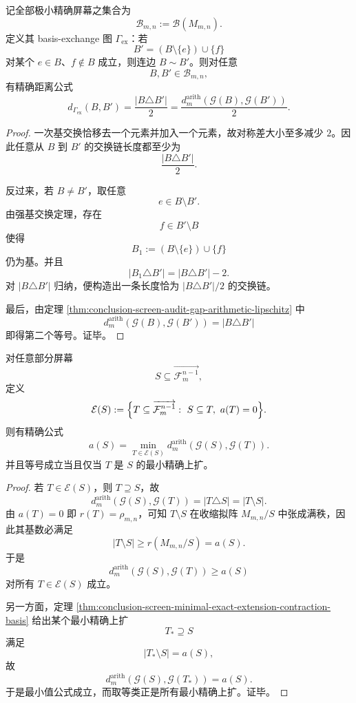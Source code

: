 \begin{theorem}[极小精确屏幕交换图的测地刚性]\label{thm:conclusion-screen-basis-exchange-graph-geodesic-rigidity}
记全部极小精确屏幕之集合为
\[
\mathcal B_{m,n}:=\mathcal B(M_{m,n}).
\]
定义其 basis-exchange 图 \(\Gamma_{\mathrm{ex}}\)：若
\[
B'=(B\setminus\{e\})\cup\{f\}
\]
对某个 \(e\in B\)、\(f\notin B\) 成立，则连边 \(B\sim B'\)。则对任意
\[
B,B'\in \mathcal B_{m,n},
\]
有精确距离公式
\[
d_{\Gamma_{\mathrm{ex}}}(B,B')
=
\frac{|B\triangle B'|}{2}
=
\frac{d_m^{\mathrm{arith}}(\mathcal G(B),\mathcal G(B'))}{2}.
\]
\end{theorem}
\begin{proof}
一次基交换恰移去一个元素并加入一个元素，故对称差大小至多减少 \(2\)。因此任意从 \(B\) 到 \(B'\) 的交换链长度都至少为
\[
\frac{|B\triangle B'|}{2}.
\]

反过来，若 \(B\neq B'\)，取任意
\[
e\in B\setminus B'.
\]
由强基交换定理，存在
\[
f\in B'\setminus B
\]
使得
\[
B_1:=(B\setminus\{e\})\cup\{f\}
\]
仍为基。并且
\[
|B_1\triangle B'|=|B\triangle B'|-2.
\]
对 \(|B\triangle B'|\) 归纳，便构造出一条长度恰为 \(|B\triangle B'|/2\) 的交换链。

最后，由定理 \ref{thm:conclusion-screen-audit-gap-arithmetic-lipschitz} 中
\[
d_m^{\mathrm{arith}}(\mathcal G(B),\mathcal G(B'))=|B\triangle B'|
\]
即得第二个等号。证毕。
\end{proof}

\begin{theorem}\label{thm:conclusion-screen-directed-arithmetic-distance-to-exact}
对任意部分屏幕
\[
S\subseteq \overrightarrow{\mathcal F_m^{n-1}},
\]
定义
\[
\mathcal E(S):=
\Bigl\{
T\subseteq \overrightarrow{\mathcal F_m^{n-1}}:\ 
S\subseteq T,\ a(T)=0
\Bigr\}.
\]
则有精确公式
\[
a(S)=\min_{T\in\mathcal E(S)} d_m^{\mathrm{arith}}(\mathcal G(S),\mathcal G(T)).
\]
并且等号成立当且仅当 \(T\) 是 \(S\) 的最小精确上扩。
\end{theorem}
\begin{proof}
若 \(T\in\mathcal E(S)\)，则 \(T\supseteq S\)，故
\[
d_m^{\mathrm{arith}}(\mathcal G(S),\mathcal G(T))
=
|T\triangle S|
=
|T\setminus S|.
\]
由 \(a(T)=0\) 即 \(r(T)=\rho_{m,n}\)，可知 \(T\setminus S\) 在收缩拟阵 \(M_{m,n}/S\) 中张成满秩，因此其基数必满足
\[
|T\setminus S|\ge r(M_{m,n}/S)=a(S).
\]
于是
\[
d_m^{\mathrm{arith}}(\mathcal G(S),\mathcal G(T))\ge a(S)
\]
对所有 \(T\in\mathcal E(S)\) 成立。

另一方面，定理 \ref{thm:conclusion-screen-minimal-exact-extension-contraction-basis} 给出某个最小精确上扩
\[
T_\ast\supseteq S
\]
满足
\[
|T_\ast\setminus S|=a(S),
\]
故
\[
d_m^{\mathrm{arith}}(\mathcal G(S),\mathcal G(T_\ast))=a(S).
\]
于是最小值公式成立，而取等类正是所有最小精确上扩。证毕。
\end{proof}

